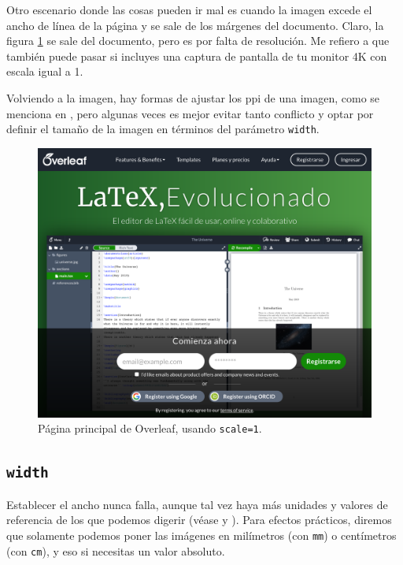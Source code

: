 Otro escenario donde las cosas pueden ir mal es cuando la imagen excede el ancho de línea de la página y se sale de los márgenes del documento. Claro, la figura \ref{fig:overleaf_home_scale} se sale del documento, pero es por falta de resolución. Me refiero a que también puede pasar si incluyes una captura de pantalla de tu monitor 4K con escala igual a 1.

Volviendo a la imagen, hay formas de ajustar los ppi de una imagen, como se menciona en \cite{bib:stack_image_data}, pero algunas veces es mejor evitar tanto conflicto y optar por definir el tamaño de la imagen en términos del parámetro \texttt{width}.

\begin{figure}[ht!]
	\centering
	\includegraphics[scale=1]{img/overleaf.png}
	\caption{Página principal de Overleaf, usando \texttt{scale=1}.}
	\label{fig:overleaf_home_scale}
\end{figure}
\FloatBarrier



\subsection{\texttt{width}}
\label{sub:width}



Establecer el ancho nunca falla, aunque tal vez haya más unidades y valores de referencia de los que podemos digerir (véase \cite{bib:overleaf_units} y \cite{bib:latex_lengths}). Para efectos prácticos, diremos que solamente podemos poner las imágenes en milímetros (con \texttt{mm}) o centímetros (con \texttt{cm}), y eso si necesitas un valor absoluto.

